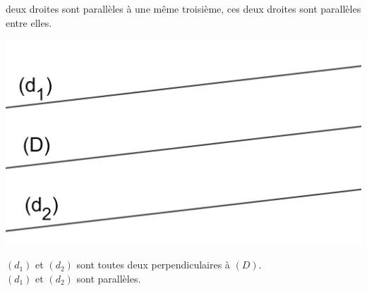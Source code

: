 \documentclass[xcolor={dvipsnames}]{beamer}
\begin{document}
\begin{frame}
	\begin{myprop}
			 deux droites sont parallèles à une même troisième,  ces deux droites sont parallèles entre elles.
	\end{myprop}
	
	
	\begin{myex}
			\begin{center}
				\includegraphics[scale=0.16]{para3}
			\end{center}
			
			 $(d_1)$ et $(d_2)$ sont toutes deux perpendiculaires à $(D)$.\\
			 $(d_1)$ et $(d_2)$ sont parallèles.
			
			
		
	\end{myex}
\end{frame}
\end{document}
